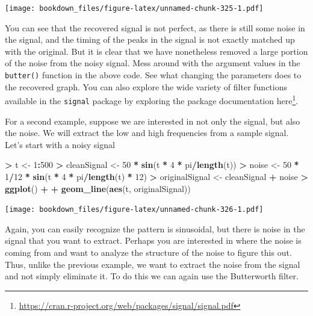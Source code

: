 \documentclass[]{krantz}
\makeatletter
\newenvironment{Shaded}{\begin{snugshade}}{\end{snugshade}}
\newcommand{\KeywordTok}[1]{\textcolor[rgb]{0.27,0.27,0.27}{\textbf{#1}}}
\newcommand{\DecValTok}[1]{\textcolor[rgb]{0.06,0.06,0.06}{#1}}
\newcommand{\StringTok}[1]{\textcolor[rgb]{0.5,0.5,0.5}{#1}}
\newcommand{\OperatorTok}[1]{\textcolor[rgb]{0.43,0.43,0.43}{\textbf{#1}}}
\newcommand{\NormalTok}[1]{#1}
\renewcommand{\href}[2]{#2\footnote{\url{#1}}}
\newenvironment{kframe}{%
\medskip{}
\setlength{\fboxsep}{.8em}
 \def\at@end@of@kframe{}%
 \ifinner\ifhmode%
  \def\at@end@of@kframe{\end{minipage}}%
  \begin{minipage}{\columnwidth}%
 \fi\fi%
 \def\FrameCommand##1{\hskip\@totalleftmargin \hskip-\fboxsep
 \colorbox{shadecolor}{##1}\hskip-\fboxsep
     \hskip-\linewidth \hskip-\@totalleftmargin \hskip\columnwidth}%
 \MakeFramed {\advance\hsize-\width
   \@totalleftmargin\z@ \linewidth\hsize
   \@setminipage}}%
 {\par\unskip\endMakeFramed%
 \at@end@of@kframe}
\renewenvironment{Shaded}{\begin{kframe}}{\end{kframe}}
\makeatother
\begin{document}
\texttt{[image: bookdown\_files/figure-latex/unnamed-chunk-325-1.pdf]}

You can see that the recovered signal is not perfect, as there is still
some noise in the signal, and the timing of the peaks in the signal is
not exactly matched up with the original. But it is clear that we have
nonetheless removed a large portion of the noise from the noisy signal.
Mess around with the argument values in the \texttt{butter()} function
in the above code. See what changing the parameters does to the
recovered graph. You can also explore the wide variety of filter
functions available in the \texttt{signal} package by exploring the
package documentation
\href{https://cran.r-project.org/web/packages/signal/signal.pdf}{here}.

For a second example, suppose we are interested in not only the signal,
but also the noise. We will extract the low and high frequencies from a
sample signal. Let's start with a noisy signal

\begin{Shaded}
\begin{Highlighting}[]
\OperatorTok{>}\StringTok{ }\NormalTok{t <-}\StringTok{ }\DecValTok{1}\OperatorTok{:}\DecValTok{500}
\OperatorTok{>}\StringTok{ }\NormalTok{cleanSignal <-}\StringTok{ }\DecValTok{50} \OperatorTok{*}\StringTok{ }\KeywordTok{sin}\NormalTok{(t }\OperatorTok{*}\StringTok{ }\DecValTok{4} \OperatorTok{*}\StringTok{ }\NormalTok{pi}\OperatorTok{/}\KeywordTok{length}\NormalTok{(t))}
\OperatorTok{>}\StringTok{ }\NormalTok{noise <-}\StringTok{ }\DecValTok{50} \OperatorTok{*}\StringTok{ }\DecValTok{1}\OperatorTok{/}\DecValTok{12} \OperatorTok{*}\StringTok{ }\KeywordTok{sin}\NormalTok{(t }\OperatorTok{*}\StringTok{ }\DecValTok{4} \OperatorTok{*}\StringTok{ }\NormalTok{pi}\OperatorTok{/}\KeywordTok{length}\NormalTok{(t) }\OperatorTok{*}\StringTok{ }\DecValTok{12}\NormalTok{)}
\OperatorTok{>}\StringTok{ }\NormalTok{originalSignal <-}\StringTok{ }\NormalTok{cleanSignal }\OperatorTok{+}\StringTok{ }\NormalTok{noise}
\OperatorTok{>}\StringTok{ }\KeywordTok{ggplot}\NormalTok{() }\OperatorTok{+}\StringTok{ }
\OperatorTok{+}\StringTok{   }\KeywordTok{geom_line}\NormalTok{(}\KeywordTok{aes}\NormalTok{(t, originalSignal))}
\end{Highlighting}
\end{Shaded}

\texttt{[image: bookdown\_files/figure-latex/unnamed-chunk-326-1.pdf]}

Again, you can easily recognize the pattern is sinusoidal, but there is
noise in the signal that you want to extract. Perhaps you are interested
in where the noise is coming from and want to analyze the structure of
the noise to figure this out. Thus, unlike the previous example, we want
to extract the noise from the signal and not simply eliminate it. To do
this we can again use the Butterworth filter.
\end{document}
